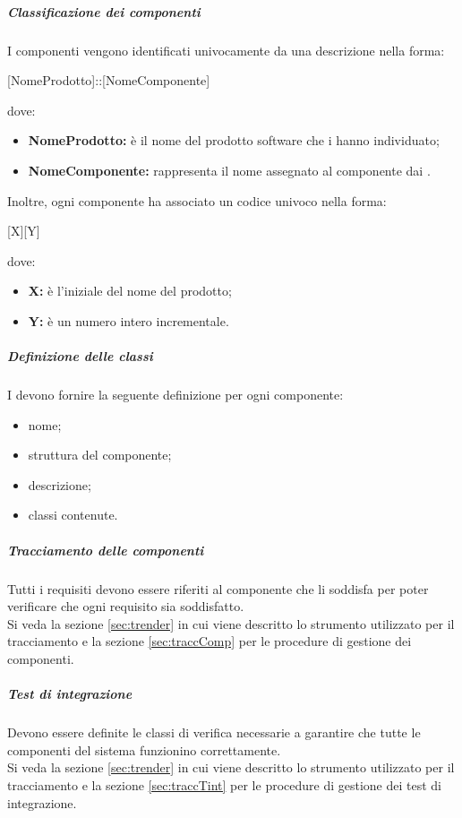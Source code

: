 	            \subparagraph{Classificazione dei componenti}
	            I componenti vengono identificati univocamente da una descrizione nella forma:
	            \begin{center}
					[NomeProdotto]::[NomeComponente]
	            \end{center}
				dove:
				\begin{itemize}
					\item \textbf{NomeProdotto:} è il nome del prodotto software che i \progettisti{} hanno individuato;
					\item \textbf{NomeComponente:} rappresenta il nome assegnato al componente dai \progettisti.
				\end{itemize}
				Inoltre, ogni componente ha associato un codice univoco nella forma:
				\begin{center}
				[X][Y]
				\end{center}
				dove:
				\begin{itemize}
					\item \textbf{X:} è l'iniziale del nome del prodotto; 
					\item \textbf{Y:} è un numero intero incrementale.
				\end{itemize}
			
				\subparagraph{Definizione delle classi}
				I \progettisti{} devono fornire la seguente definizione per ogni componente:
				\begin{itemize}
					\item nome;
					\item struttura del componente;
					\item descrizione;
					\item classi contenute.
				\end{itemize}
                \subparagraph{Tracciamento delle componenti}
                Tutti i requisiti devono essere riferiti al componente che li soddisfa per poter verificare che ogni requisito sia soddisfatto.  \\
                Si veda la sezione \ref{sec:trender} in cui viene descritto lo strumento utilizzato per il tracciamento e la sezione \ref{sec:traccComp} per le procedure di gestione dei componenti.
                \subparagraph{Test di integrazione}\label{sec:testInt}
                Devono essere definite le classi di verifica necessarie a garantire che tutte le componenti del sistema funzionino correttamente. \\
                Si veda la sezione \ref{sec:trender} in cui viene descritto lo strumento utilizzato per il tracciamento e la sezione \ref{sec:traccTint} per le procedure di gestione dei test di integrazione.
                
